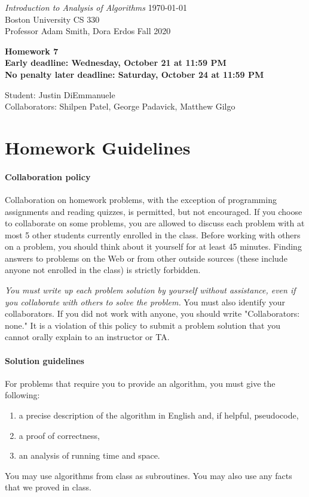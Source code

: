 \documentclass[letterpaper,11pt]{article}
\begin{document}
{\noindent\large
{\em Introduction to Analysis of Algorithms} \hfill \today\\
Boston University \hfill CS 330\\
Professor  Adam Smith, Dora Erdos \hfill Fall 2020\\}
\vspace{1pt}
\hrulefill\vspace{3mm}
\begin{center}
{\LARGE\bf Homework 7}\\
{\bf Early deadline: Wednesday, October 21 at 11:59 PM \\ No penalty later deadline: Saturday, October 24 at 11:59 PM}
\end{center}

\begin{center}
    \color{teal}
   Student: Justin DiEmmanuele \\
    Collaborators: Shilpen Patel, George Padavick, Matthew Gilgo
\end{center}

\section*{Homework Guidelines}

\paragraph{Collaboration policy} Collaboration on homework problems, with the exception of
programming assignments and reading quizzes, is permitted, but not encouraged.
If you
choose to collaborate on some problems, you are allowed to discuss
each problem with at most 5 other students currently enrolled in the
class.
Before working with others on a problem, you should think about it
yourself for at least 45 minutes. Finding answers to problems on the
Web or from other outside sources (these include anyone not enrolled
in the class) is strictly forbidden.

{\em You must write up each problem solution by yourself without
assistance, even if you collaborate with others to solve the
problem.} You must also identify your collaborators. If you did not
work with anyone, you should write "Collaborators: none." It is a
violation of this policy to submit a problem solution that you
cannot orally explain to an instructor or TA.
\paragraph{Solution guidelines} For problems that require you to provide an algorithm, you must give the following:
    \begin{enumerate}
\item  a precise description of the algorithm in English and, if helpful, pseudocode,
\item a proof of correctness,
\item an analysis of running time and space.
\end{enumerate}
You may use algorithms from class as subroutines. You may also use any facts that we proved in class.
\end{document}
